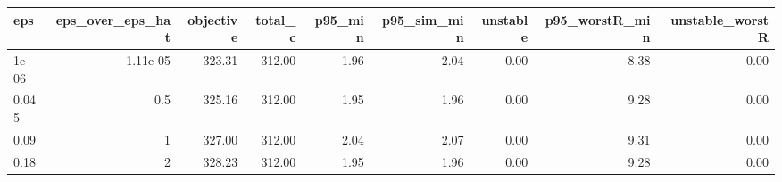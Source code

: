 \begin{tabular}{lrrrrrrrr}
\toprule
eps & eps\_over\_eps\_hat & objective & total\_c & p95\_min & p95\_sim\_min & unstable & p95\_worstR\_min & unstable\_worstR \\
\midrule
1e-06 & 1.11e-05 & 323.31 & 312.00 & 1.96 & 2.04 & 0.00 & 8.38 & 0.00 \\
0.045 & 0.5 & 325.16 & 312.00 & 1.95 & 1.96 & 0.00 & 9.28 & 0.00 \\
0.09 & 1 & 327.00 & 312.00 & 2.04 & 2.07 & 0.00 & 9.31 & 0.00 \\
0.18 & 2 & 328.23 & 312.00 & 1.95 & 1.96 & 0.00 & 9.28 & 0.00 \\
\bottomrule
\end{tabular}
